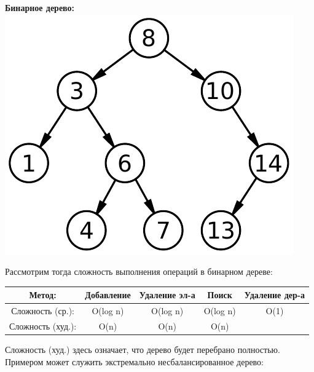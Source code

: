 \documentclass[utf8,14pt,a4paper,oneside,russian]{book}
\begin{document}
	\begin{center}
		\textbf{Бинарное дерево:}\\
		\includegraphics[scale=1]{binary_tree}\\
	\end{center}
	
	Рассмотрим тогда сложность выполнения операций в бинарном дереве:
	
	\begin{longtable}{c|c|c|c|c}
		Метод: &Добавление&Удаление эл-а&Поиск&Удаление дер-а\\\hline
		Сложность (ср.): &O(log n)&O(log n)&O(log n)&O(1)\\
		Сложность (худ.): &O(n)&O(n)&O(n)&\\
	\end{longtable}

	Сложность (худ.) здесь означает, что дерево будет перебрано полностью. Примером может служить экстремально несбалансированное дерево:
	
\end{document}
